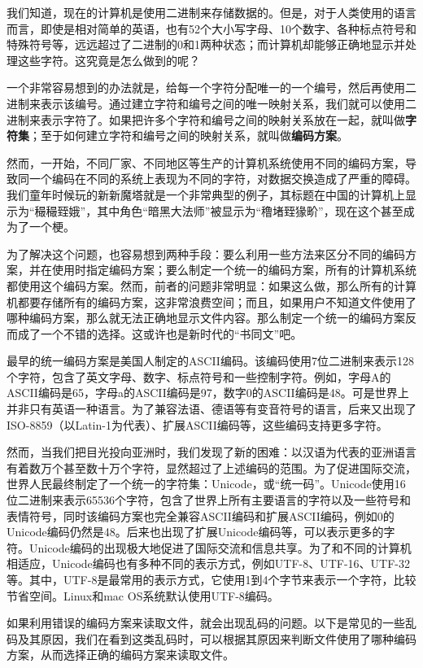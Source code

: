 我们知道，现在的计算机是使用二进制来存储数据的。但是，对于人类使用的语言而言，即使是相对简单的英语，也有52个大小写字母、10个数字、各种标点符号和特殊符号等，远远超过了二进制的0和1两种状态；而计算机却能够正确地显示并处理这些字符。这究竟是怎么做到的呢？

一个非常容易想到的办法就是，给每一个字符分配唯一的一个编号，然后再使用二进制来表示该编号。通过建立字符和编号之间的唯一映射关系，我们就可以使用二进制来表示字符了。如果把许多个字符和编号之间的映射关系放在一起，就叫做\textbf{字符集}；至于如何建立字符和编号之间的映射关系，就叫做\textbf{编码方案}。

然而，一开始，不同厂家、不同地区等生产的计算机系统使用不同的编码方案，导致同一个编码在不同的系统上表现为不同的字符，对数据交换造成了严重的障碍。我们童年时候玩的新新魔塔就是一个非常典型的例子，其标题在中国的计算机上显示为“穝穝臸娥”，其中角色“暗黑大法师”被显示为“穞堵臸猭畍”，现在这个甚至成为了一个梗。

为了解决这个问题，也容易想到两种手段：要么利用一些方法来区分不同的编码方案，并在使用时指定编码方案；要么制定一个统一的编码方案，所有的计算机系统都使用这个编码方案。然而，前者的问题非常明显：如果这么做，那么所有的计算机都要存储所有的编码方案，这非常浪费空间；而且，如果用户不知道文件使用了哪种编码方案，那么就无法正确地显示文件内容。那么制定一个统一的编码方案反而成了一个不错的选择。这或许也是新时代的“书同文”吧。

最早的统一编码方案是美国人制定的ASCII编码。该编码使用7位二进制来表示128个字符，包含了英文字母、数字、标点符号和一些控制字符。例如，字母A的ASCII编码是65，字母a的ASCII编码是97，数字0的ASCII编码是48。可是世界上并非只有英语一种语言。为了兼容法语、德语等有变音符号的语言，后来又出现了ISO-8859（以Latin-1为代表）、扩展ASCII编码等，这些编码支持更多字符。

然而，当我们把目光投向亚洲时，我们发现了新的困难：以汉语为代表的亚洲语言有着数万个甚至数十万个字符，显然超过了上述编码的范围。为了促进国际交流，世界人民最终制定了一个统一的字符集：Unicode，或“统一码”。Unicode使用16位二进制来表示65536个字符，包含了世界上所有主要语言的字符以及一些符号和表情符号，同时该编码方案也完全兼容ASCII编码和扩展ASCII编码，例如0的Unicode编码仍然是48。后来也出现了扩展Unicode编码等，可以表示更多的字符。Unicode编码的出现极大地促进了国际交流和信息共享。为了和不同的计算机相适应，Unicode编码也有多种不同的表示方式，例如UTF-8、UTF-16、UTF-32等。其中，UTF-8是最常用的表示方式，它使用1到4个字节来表示一个字符，比较节省空间。Linux和mac OS系统默认使用UTF-8编码。

如果利用错误的编码方案来读取文件，就会出现乱码的问题。以下是常见的一些乱码及其原因，我们在看到这类乱码时，可以根据其原因来判断文件使用了哪种编码方案，从而选择正确的编码方案来读取文件。

